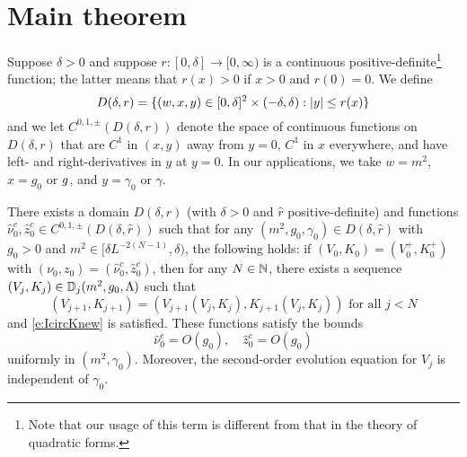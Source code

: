 \section{Main theorem}

Suppose $\delta > 0$ and suppose $r : [0, \delta] \to [0, \infty)$
is a continuous positive-definite\footnote{Note that our usage of this term is
different from that in the theory of quadratic forms.} function; the latter
means that $r(x) > 0$ if $x > 0$ and $r(0) = 0$.
We define
\begin{equation}
\lbeq{Ddef}
D(\delta, r)
	=
\{ (w, x, y) \in [0, \delta]^2 \times (-\delta, \delta) : |y| \leq r(x) \}
\end{equation}
and we let $C^{0,1,\pm}(D(\delta, r))$ denote the space of continuous functions on $D(\delta, r)$
that are $C^1$ in $(x, y)$ away from $y = 0$, $C^1$ in $x$ everywhere,
and have left- and right-derivatives in $y$ at $y = 0$.
In our applications, we take $w = m^2$, $x = g_0$ or $g$,
and $y = \gamma_0$ or $\gamma$.

\begin{theorem}
\label{thm:rhatflow}
There exists a domain $D(\delta, \hat r)$ (with $\delta > 0$ and $\hat r$
positive-definite) and functions $\hat\nu_0^c, \hat z_0^c \in C^{0,1,\pm}(D(\delta, \hat r))$
such that for any $(m^2, g_0, \gamma_0) \in D(\delta, \hat r)$
with $g_0 > 0$ and $m^2 \in [\delta L^{-2 (N - 1)}, \delta)$, the following holds:
if $(V_0, K_0) = (V^+_0, K^+_0)$ with $(\nu_0, z_0) = (\hat\nu_0^c, \hat z_0^c)$,
then for any $N \in {\mathbb N}$,
there exists a sequence $(V_j, K_j) \in \mathbb{D}_j(m^2, g_0, \Lambda)$ such that
\begin{equation}
	\label{e:VjKjDj-hat}
	(V_{j+1},K_{j+1}) = (V_{j+1}(V_j, K_j), K_{j+1}(V_j, K_j)) \text{ for all } j < N
\end{equation}
and \eqref{e:IcircKnew} is satisfied.
These functions satisfy the bounds
\begin{equation}
\label{e:hat-est}
\hat\nu_0^c = O(g_0),
\quad
\hat z_0^c = O(g_0)
\end{equation}
uniformly in $(m^2, \gamma_0)$.
Moreover, the second-order evolution equation for $V_j$ is independent of $\gamma_0$.
\end{theorem}
